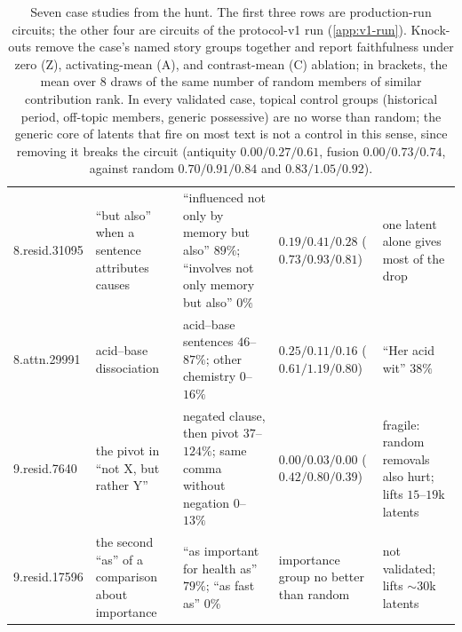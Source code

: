 \documentclass[10pt]{article}
\begin{document}
\begin{table}[!htbp]
\begin{tabular}{p{2.0cm}p{2.7cm}p{3.0cm}p{2.5cm}p{2.3cm}}
8.resid.31095 & ``but also'' when a sentence attributes causes & ``influenced not only by memory but also'' $89\%$; ``involves not only memory but also'' $0\%$ & $0.19 / 0.41 / 0.28$ \newline ($0.73 / 0.93 / 0.81$) & one latent alone gives most of the drop \\
8.attn.29991 & acid--base dissociation & acid--base sentences $46$--$87\%$; other chemistry $0$--$16\%$ & $0.25 / 0.11 / 0.16$ \newline ($0.61 / 1.19 / 0.80$) & ``Her acid wit'' $38\%$ \\
9.resid.7640 & the pivot in ``not X, but rather Y'' & negated clause, then pivot $37$--$124\%$; same comma without negation $0$--$13\%$ & $0.00 / 0.03 / 0.00$ \newline ($0.42 / 0.80 / 0.39$) & fragile: random removals also hurt; lifts $15$--$19$k latents \\
9.resid.17596 & the second ``as'' of a comparison about importance & ``as important for health as'' $79\%$; ``as fast as'' $0\%$ & importance group no better than random & not validated; lifts ${\sim}30$k latents \\
\bottomrule
\end{tabular}
\caption{Seven case studies from the hunt.
The first three rows are production-run circuits; the other four are circuits of the protocol-v1 run (\cref{app:v1-run}).
Knock-outs remove the case's named story groups together and report faithfulness under zero (Z), activating-mean (A), and contrast-mean (C) ablation; in brackets, the mean over $8$ draws of the same number of random members of similar contribution rank.
In every validated case, topical control groups (historical period, off-topic members, generic possessive) are no worse than random; the generic core of latents that fire on most text is not a control in this sense, since removing it breaks the circuit (antiquity $0.00 / 0.27 / 0.61$, fusion $0.00 / 0.73 / 0.74$, against random $0.70 / 0.91 / 0.84$ and $0.83 / 1.05 / 0.92$).}
\label{tab:case-studies}
\end{table}
\end{document}
